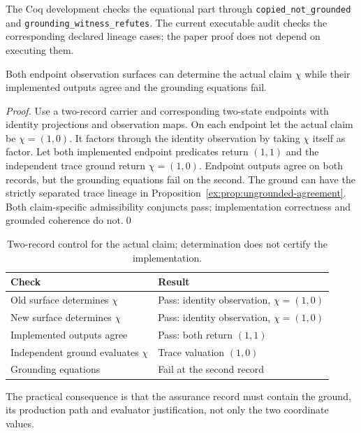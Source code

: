 \documentclass[twocolumn,envcountsect,envcountsame,natbib]{svjour3}
\newcommand{\code}[1]{\texttt{#1}}
\begin{document}
The Coq development checks the equational part through \code{copied\_\allowbreak not\_\allowbreak grounded} and \code{grounding\_\allowbreak witness\_\allowbreak refutes}. The current executable audit checks the corresponding declared lineage cases; the paper proof does not depend on executing them.

\begin{proposition}\label{ex:prop:claim-control}
Both endpoint observation surfaces can determine the actual claim $\chi$ while their implemented outputs agree and the grounding equations fail.
\end{proposition}
\begin{proof}
Use a two-record carrier and corresponding two-state endpoints with identity projections and observation maps. On each endpoint let the actual claim be $\chi=(1,0)$. It factors through the identity observation by taking $\chi$ itself as factor. Let both implemented endpoint predicates return $(1,1)$ and the independent trace ground return $\chi=(1,0)$. Endpoint outputs agree on both records, but the grounding equations fail on the second. The ground can have the strictly separated trace lineage in Proposition~\ref{ex:prop:ungrounded-agreement}. Both claim-specific admissibility conjuncts pass; implementation correctness and grounded coherence do not.\qed
\end{proof}

\begin{table}[htbp]
\centering\small
\caption{Two-record control for the actual claim; determination does not certify the implementation.}\label{ex:tab:claim-control}
\begin{tabularx}{\textwidth}{@{}lL@{}}
\toprule
Check & Result \\
\midrule
Old surface determines $\chi$ & Pass: identity observation, $\chi=(1,0)$ \\
New surface determines $\chi$ & Pass: identity observation, $\chi=(1,0)$ \\
Implemented outputs agree & Pass: both return $(1,1)$ \\
Independent ground evaluates $\chi$ & Trace valuation $(1,0)$ \\
Grounding equations & Fail at the second record \\
\bottomrule
\end{tabularx}
\end{table}

The practical consequence is that the assurance record must contain the ground, its production path and evaluator justification, not only the two coordinate values.
\end{document}
